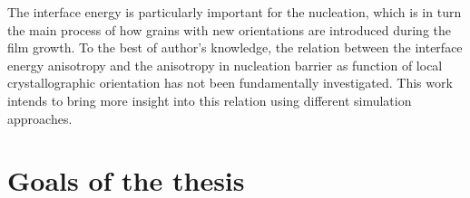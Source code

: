 The interface energy is particularly important for the nucleation, which is in turn the main process of how grains with new orientations are introduced during the film growth. To the best of author's knowledge, the relation between the interface energy anisotropy and the anisotropy in nucleation barrier as function of local crystallographic orientation has not been fundamentally investigated. This work intends to bring more insight into this relation using different simulation approaches.



\section{Goals of the thesis}

\noindent{}

